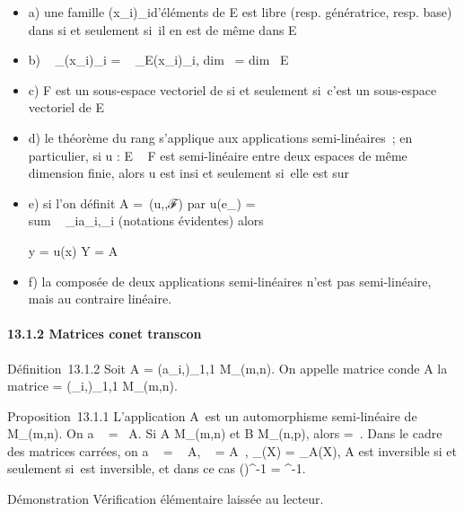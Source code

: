 \documentclass[]{article}
\begin{document}
\begin{itemize}
\item
  a) une famille (x\_i)\_i\inI d'éléments de E est libre
  (resp. génératrice, resp. base) dans \checkE si et
  seulement si~il en est de même dans E
\item
  b) \mathrmrg~
  \_\checkE(x\_i)\_i\inI
  = \mathrmrg~
  \_E(x\_i)\_i\inI, dim~
  \checkE = dim~ E
\item
  c) F est un sous-espace vectoriel de \checkE si et
  seulement si~c'est un sous-espace vectoriel de E
\item
  d) le théorème du rang s'applique aux applications semi-linéaires~; en
  particulier, si u : E \rightarrow~ F est semi-linéaire entre deux espaces de même
  dimension finie, alors u est in\jmathective si et seulement si~elle est
  sur\jmathective
\item
  e) si l'on définit A =\
  \mathrmMat (u,,ℱ) par u(e\_\jmath)
  = \\sum ~
  \_ia\_i,\jmathf\_i (notations évidentes) alors

  y = u(x) \Leftrightarrow Y =
  A\overlineX
\item
  f) la composée de deux applications semi-linéaires n'est pas
  semi-linéaire, mais au contraire linéaire.
\end{itemize}

\paragraph{13.1.2 Matrices con et transcon}

Définition~13.1.2 Soit A = (a\_i,\jmath)\_1\leqi\leqm,1\leq\jmath\leqn \in
M\_\mathbb{C}(m,n). On appelle matrice con\jmathuguée de A la matrice
\overlineA =
(\overlinea\_i,\jmath)\_1\leqi\leqm,1\leq\jmath\leqn \in
M\_(m,n).

Proposition~13.1.1 L'application
A\mapsto~\overlineA est un
automorphisme semi-linéaire de M\_(m,n). On a
\mathrmrg\overlineA~
= \mathrmrg~A. Si A \in
M\_(m,n) et B \in M\_(n,p), alors
\overlineAB =
\overlineA\,\overlineB.
Dans le cadre des matrices carrées, on a
~
\overlineA =
\overline{}~
A,
\overlineA~
=
\overline{}A~,
\chi\_\overlineA(X) =
\overline\chi\_A(X), A est inversible si et
seulement si~\overlineA est inversible, et dans ce
cas (\overlineA)^-1 =
\overlineA^-1.

Démonstration Vérification élémentaire laissée au lecteur.
\end{document}
